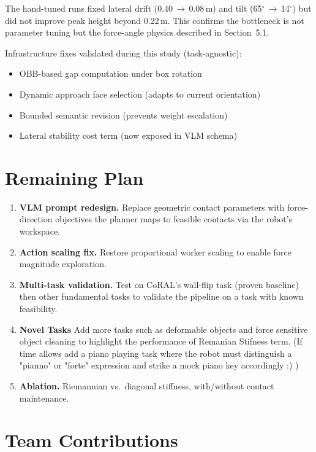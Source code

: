 \documentclass[10pt,twocolumn]{article}
\begin{document}
The hand-tuned runs fixed lateral drift (0.40\,$\to$\,0.08\,m) and tilt (65$^\circ$\,$\to$\,14$^\circ$) but did not improve peak height beyond 0.22\,m. This confirms the bottleneck is not parameter tuning but the force-angle physics described in Section~5.1.

Infrastructure fixes validated during this study (task-agnostic):
\begin{itemize}
\item OBB-based gap computation under box rotation
\item Dynamic approach face selection (adapts to current orientation)
\item Bounded semantic revision (prevents weight escalation)
\item Lateral stability cost term (now exposed in VLM schema)
\end{itemize}

\section{Remaining Plan}

\begin{enumerate}
\item \textbf{VLM prompt redesign.} Replace geometric contact parameters with force-direction objectives the planner maps to feasible contacts via the robot's workspace.
\item \textbf{Action scaling fix.} Restore proportional worker scaling to enable force magnitude exploration.
\item \textbf{Multi-task validation.} Test on CoRAL's wall-flip task (proven baseline) then other fundamental tasks to validate the pipeline on a task with known feasibility.
\item \textbf{Novel Tasks} Add more tasks such as deformable objects and force sensitive object cleaning to highlight the performance of Remanian Stifness term. (If time allows add a piano playing task where the robot must distinguish a "pianno" or "forte" expression and strike a mock piano key accordingly :) )
\item \textbf{Ablation.} Riemannian vs.\ diagonal stiffness, with/without contact maintenance.
\end{enumerate}

\section{Team Contributions}
\end{document}
